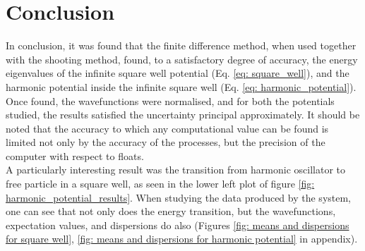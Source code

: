 \documentclass[10pt,a4paper]{article}
\theoremstyle{definition}
\theoremstyle{remark}
\begin{document}
\section{Conclusion}
In conclusion, it was found that the finite difference method, when used together with the shooting method, found, to a satisfactory degree of accuracy, the energy eigenvalues of the infinite square well potential (Eq. \ref{eq: square_well}), and the harmonic potential inside the infinite square well (Eq. \ref{eq: harmonic_potential}). Once found, the wavefunctions were normalised, and for both the potentials studied, the results satisfied the uncertainty principal approximately. It should be noted that the accuracy to which any computational value can be found is limited not only by the accuracy of the processes, but the precision of the computer with respect to floats.\\
\indent A particularly interesting result was the transition from harmonic oscillator to free particle in a square well, as seen in the lower left plot of figure \ref{fig: harmonic_potential_results}. When studying the data produced by the system, one can see that not only does the energy transition, but the wavefunctions, expectation values, and dispersions do also (Figures \ref{fig: means and dispersions for square well}, \ref{fig: means and dispersions for harmonic potential} in appendix).
\end{document}
